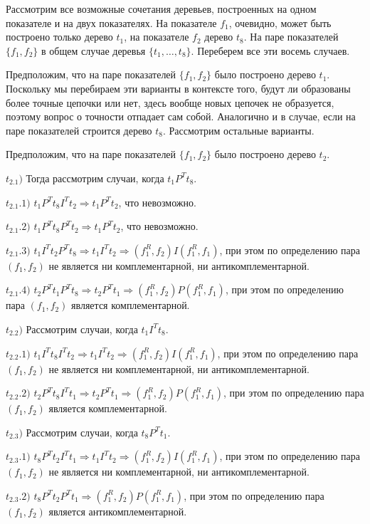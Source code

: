 \documentclass[12pt]{a&t}
\begin{document}
Рассмотрим все возможные сочетания деревьев, построенных на одном показателе и на двух показателях. На показателе $f_1$, очевидно, может быть построено только дерево $t_1$, на показателе $f_2$ дерево $t_8$. На паре показателей $\{f_1, f_2 \}$ в общем случае деревья $ \{t_1, \ldots , t_8 \} $. Переберем все эти восемь случаев. 

Предположим, что на паре показателей $ \{ f_1, f_2 \} $ было построено дерево $t_1$. Поскольку мы перебираем эти варианты в контексте того, будут ли образованы более точные цепочки или нет, здесь вообще новых цепочек не образуется, поэтому вопрос о точности отпадает сам собой. Аналогично и в случае, если на паре показателей строится дерево $t_8$. Рассмотрим остальные варианты. 

Предположим, что на паре показателей $ \{ f_1, f_2 \} $ было построено дерево $t_2$. 

$t_2.1)$ Тогда рассмотрим случаи, когда $t_1 P^T t_8$. 

$t_2.1.1)$ $t_1 P^T t_8 I^T t_2 \Rightarrow t_1 P^T t_2$, что невозможно.

$t_2.1.2)$ $t_1 P^T t_8 P^T t_2 \Rightarrow t_1 P^T t_2$, что невозможно.

$t_2.1.3)$ $t_1 I^T t_2 P^T t_8 \Rightarrow t_1 I^T t_2 \Rightarrow (f_1^R, f_2)I(f_1^R, f_1) $, при этом по определению пара $(f_1, f_2)$ не является ни комплементарной, ни антикомплементарной.

$t_2.1.4)$ $t_2 P^T t_1 P^T t_8 \Rightarrow t_2 P^T t_1 \Rightarrow (f_1^R, f_2)P(f_1^R, f_1) $, при этом по определению пара $(f_1, f_2)$ является комплементарной.

$t_2.2)$ Рассмотрим случаи, когда $t_1 I^T t_8$. 

$t_2.2.1)$ $t_1 I^T t_8 I^T t_2 \Rightarrow t_1 I^T t_2 \Rightarrow (f_1^R, f_2)I(f_1^R, f_1) $, при этом по определению пара $(f_1, f_2)$ не является ни комплементарной, ни антикомплементарной.

$t_2.2.2)$ $t_2 P^T t_8 I^T t_1 \Rightarrow t_2 P^T t_1 \Rightarrow (f_1^R, f_2)P(f_1^R, f_1) $, при этом по определению пара $(f_1, f_2)$ является комплементарной.

$t_2.3)$ Рассмотрим случаи, когда $t_8 P^T t_1$. 

$t_2.3.1)$ $t_8 P^T t_2 I^T t_1 \Rightarrow t_1 I^T t_2 \Rightarrow (f_1^R, f_2)I(f_1^R, f_1) $, при этом по определению пара $(f_1, f_2)$ не является ни комплементарной, ни антикомплементарной.

$t_2.3.2)$ $t_8 P^T t_2 P^T t_1 \Rightarrow (f_1^R, f_2)P(f_1^R, f_1) $, при этом по определению пара $(f_1, f_2)$ является антикомплементарной.
\end{document}

